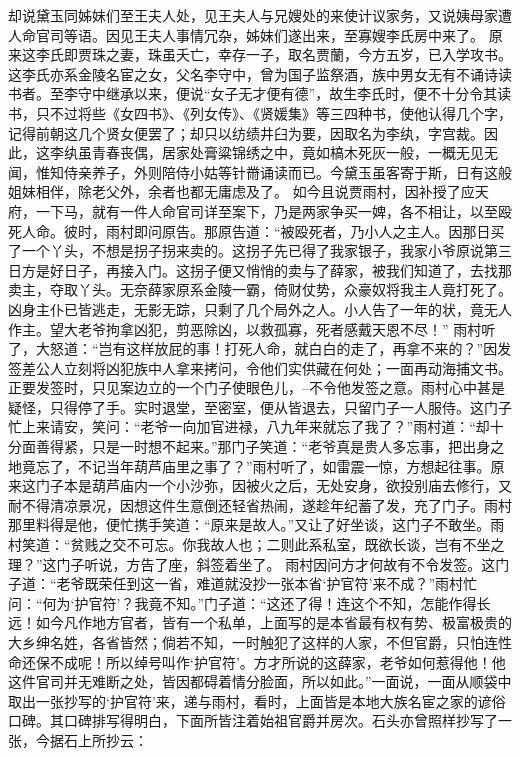 \documentclass[12pt,oneside]{book}
\begin{document}
却说黛玉同姊妹们至王夫人处，见王夫人与兄嫂处的来使计议家务，又说姨母家遭人命官司等语。因见王夫人事情冗杂，姊妹们遂出来，至寡嫂李氏房中来了。
原来这李氏即贾珠之妻，珠虽夭亡，幸存一子，取名贾蘭，今方五岁，已入学攻书。这李氏亦系金陵名宦之女，父名李守中，曾为国子监祭酒，族中男女无有不诵诗读书者。至李守中继承以来，便说“女子无才便有德”，故生李氏时，便不十分令其读书，只不过将些《女四书》、《列女传》、《贤媛集》等三四种书，使他认得几个字，记得前朝这几个贤女便罢了；却只以纺绩井臼为要，因取名为李纨，字宫裁。因此，这李纨虽青春丧偶，居家处膏粱锦绣之中，竟如槁木死灰一般，一概无见无闻，惟知侍亲养子，外则陪侍小姑等针黹诵读而已。今黛玉虽客寄于斯，日有这般姐妹相伴，除老父外，余者也都无庸虑及了。
如今且说贾雨村，因补授了应天府，一下马，就有一件人命官司详至案下，乃是两家争买一婢，各不相让，以至殴死人命。彼时，雨村即问原告。那原告道：“被殴死者，乃小人之主人。因那日买了一个丫头，不想是拐子拐来卖的。这拐子先已得了我家银子，我家小爷原说第三日方是好日子，再接入门。这拐子便又悄悄的卖与了薛家，被我们知道了，去找那卖主，夺取丫头。无奈薛家原系金陵一霸，倚财仗势，众豪奴将我主人竟打死了。凶身主仆已皆逃走，无影无踪，只剩了几个局外之人。小人告了一年的状，竟无人作主。望大老爷拘拿凶犯，剪恶除凶，以救孤寡，死者感戴天恩不尽！”
雨村听了，大怒道：“岂有这样放屁的事！打死人命，就白白的走了，再拿不来的？”因发签差公人立刻将凶犯族中人拿来拷问，令他们实供藏在何处；一面再动海捕文书。正要发签时，只见案边立的一个门子使眼色儿，--不令他发签之意。雨村心中甚是疑怪，只得停了手。实时退堂，至密室，便从皆退去，只留门子一人服侍。这门子忙上来请安，笑问：“老爷一向加官进禄，八九年来就忘了我了？”雨村道：“却十分面善得紧，只是一时想不起来。”那门子笑道：“老爷真是贵人多忘事，把出身之地竟忘了，不记当年葫芦庙里之事了？”雨村听了，如雷震一惊，方想起往事。原来这门子本是葫芦庙内一个小沙弥，因被火之后，无处安身，欲投别庙去修行，又耐不得清凉景况，因想这件生意倒还轻省热闹，遂趁年纪蓄了发，充了门子。雨村那里料得是他，便忙携手笑道：“原来是故人。”又让了好坐谈，这门子不敢坐。雨村笑道：“贫贱之交不可忘。你我故人也；二则此系私室，既欲长谈，岂有不坐之理？”这门子听说，方告了座，斜签着坐了。
雨村因问方才何故有不令发签。这门子道：“老爷既荣任到这一省，难道就没抄一张本省‘护官符’来不成？”雨村忙问：“何为‘护官符’？我竟不知。”门子道：“这还了得！连这个不知，怎能作得长远！如今凡作地方官者，皆有一个私单，上面写的是本省最有权有势、极富极贵的大乡绅名姓，各省皆然；倘若不知，一时触犯了这样的人家，不但官爵，只怕连性命还保不成呢！所以绰号叫作‘护官符’。方才所说的这薛家，老爷如何惹得他！他这件官司并无难断之处，皆因都碍着情分脸面，所以如此。”一面说，一面从顺袋中取出一张抄写的‘护官符’来，递与雨村，看时，上面皆是本地大族名宦之家的谚俗口碑。其口碑排写得明白，下面所皆注着始祖官爵并房次。石头亦曾照样抄写了一张，今据石上所抄云：
\end{document}
